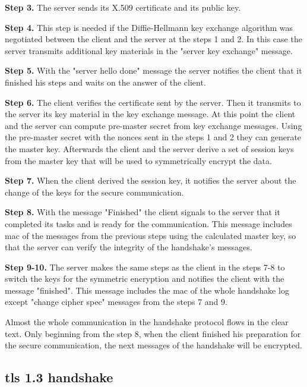 \textbf{Step 3.} The server sends its X.509 certificate and its public key.

\textbf{Step 4.} This step is needed if the Diffie-Hellmann key exchange algorithm was negotiated between the client and the server at the steps 1 and 2. In this case the server transmits additional key materials in the "server key exchange" message.

\textbf{Step 5.} With the "server hello done" message the server notifies the client that it finished his steps and waits on the answer of the client.

\textbf{Step 6.} The client verifies the certificate sent by the server. Then it transmits to the server its key material in the key exchange message. 
At this point the client and the server can compute pre-master secret from key exchange messages. Using the pre-master secret with the nonces sent in the steps 1 and 2 they can generate the master key. Afterwards the client and the server derive a set of session keys from the master key that will be used to symmetrically encrypt the data.

\textbf{Step 7.} When the client derived the session key, it notifies the server about the change of the keys for the secure communication.

\textbf{Step 8.} With the message "Finished" the client signals to the server that it completed its tasks and is ready for the communication. This message includes \gls{mac} of the messages from the previous steps using the calculated master key, so that the server can verify the integrity of the handshake's messages.

\textbf{Step 9-10.} The server makes the same steps as the client in the steps 7-8 to switch the keys for the symmetric encryption and notifies the client with the message "finished". This message includes the \gls{mac} of the whole handshake log except "change cipher spec" messages from the steps 7 and 9. \cite{sslstore:handshake}\cite{Hassenstein}

Almost the whole communication in the handshake protocol flows in the clear text. Only beginning from the step 8, when the client finished his preparation for the secure communication, the next messages of the handshake will be encrypted.

\subsection{\gls{tls} 1.3 handshake}
\label{subsec:handshake1_3}


